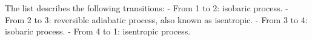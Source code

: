 The list describes the following transitions:
- From 1 to 2: isobaric process.
- From 2 to 3: reversible adiabatic process, also known as isentropic.
- From 3 to 4: isobaric process.
- From 4 to 1: isentropic process.